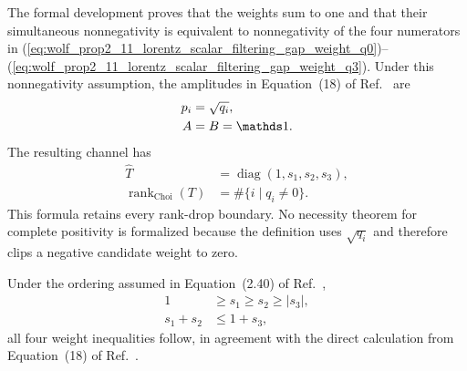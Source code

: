 \documentclass{article}
\begin{document}
The formal development proves that the weights sum to one and that their
simultaneous nonnegativity is equivalent to nonnegativity of the four
numerators in
(\ref{eq:wolf_prop2_11_lorentz_scalar_filtering_gap_weight_q0})--%
(\ref{eq:wolf_prop2_11_lorentz_scalar_filtering_gap_weight_q3}). Under this
nonnegativity assumption, the amplitudes in Equation~(18) of
Ref.~\cite{VerstraeteVerschelde2002QuantumChannels} are
\begin{align}
    p_i
        &=\sqrt{q_i},
    \label{eq:wolf_prop2_11_lorentz_scalar_filtering_gap_pauli_amplitudes}\\
    A
        &=B=\one.
    \label{eq:wolf_prop2_11_lorentz_scalar_filtering_gap_identity_filters}
\end{align}
The resulting channel has
\begin{align}
    \widehat T
        &=\operatorname{diag}(1,s_1,s_2,s_3),
    \label{eq:wolf_prop2_11_lorentz_scalar_filtering_gap_diagonal_transfer}\\
    \operatorname{rank}_{\mathrm{Choi}}(T)
        &=\#\{i\mid q_i\neq0\}.
    \label{eq:wolf_prop2_11_lorentz_scalar_filtering_gap_diagonal_rank}
\end{align}
This formula retains every rank-drop boundary. No necessity theorem for
complete positivity is formalized because the definition uses $\sqrt{q_i}$
and therefore clips a negative candidate weight to zero.

Under the ordering assumed in Equation~(2.40) of
Ref.~\cite{Wolf2012Quantum},
\begin{align}
    1
        &\geq s_1\geq s_2\geq|s_3|,
    \label{eq:wolf_prop2_11_lorentz_scalar_filtering_gap_wolf_ordering}\\
    s_1+s_2
        &\leq1+s_3,
    \label{eq:wolf_prop2_11_lorentz_scalar_filtering_gap_wolf_cp_bound}
\end{align}
all four weight inequalities follow, in agreement with the direct calculation
from Equation~(18) of
Ref.~\cite{VerstraeteVerschelde2002QuantumChannels}.
\end{document}
